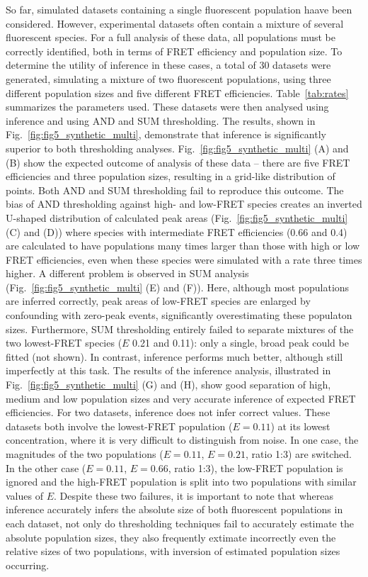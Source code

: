 So far, simulated datasets containing a single fluorescent population haave been considered. However, experimental datasets often contain a  mixture of several fluorescent species. For a full analysis of these data, all populations must be correctly identified, both in terms of FRET efficiency and population size. To determine the utility of inference in these cases, a total of 30 datasets were generated, simulating a mixture of two fluorescent populations, using three different population sizes and five different FRET efficiencies.  Table~\ref{tab:rates} summarizes the parameters used. These datasets were then analysed using inference and using AND and SUM thresholding. The results, shown in Fig.~\ref{fig:fig5_synthetic_multi}, demonstrate that inference is significantly superior to both thresholding analyses. Fig.~\ref{fig:fig5_synthetic_multi} (A) and (B) show the expected outcome of analysis of these data -- there are five FRET efficiencies and three population sizes, resulting in a grid-like distribution of points.  Both AND and SUM thresholding fail to reproduce this outcome.  The bias of AND thresholding against high- and low-FRET species creates an inverted U-shaped distribution of calculated peak areas (Fig.~\ref{fig:fig5_synthetic_multi} (C) and (D)) where species with intermediate FRET efficiencies (0.66 and 0.4) are calculated to have populations many times larger than those with high or low FRET efficiencies, even when these species were simulated with a rate three times higher.  A different problem is observed in SUM analysis (Fig.~\ref{fig:fig5_synthetic_multi} (E) and (F)). Here, although most populations are inferred correctly, peak areas of low-FRET species are enlarged by confounding with zero-peak events, significantly overestimating these populaton sizes. Furthermore, SUM thresholding entirely failed to separate mixtures of the two lowest-FRET species ($E$ 0.21 and 0.11): only a single, broad peak could be fitted (not shown). In contrast, inference performs much better, although still imperfectly at this task. The results of the inference analysis, illustrated in Fig.~\ref{fig:fig5_synthetic_multi} (G) and (H), show good separation of high, medium and low population sizes and very accurate inference of expected FRET efficiencies. For two datasets, inference does not infer correct values. These datasets both involve the lowest-FRET population ($E = 0.11$) at its lowest concentration, where it is very difficult to distinguish from noise. In one case, the magnitudes of the two populations ($E = 0.11$, $E = 0.21$, ratio 1:3) are switched. In the other case ($E = 0.11$, $E = 0.66$, ratio 1:3), the low-FRET population is ignored and the high-FRET population is split into two populations with similar values of $E$.  Despite these two failures, it is important to note that whereas inference accurately infers the absolute size of both fluorescent populations in each dataset, not only do thresholding techniques fail to accurately estimate the absolute population sizes, they also frequently extimate incorrectly even the relative sizes of two populations, with inversion of estimated population sizes occurring.
